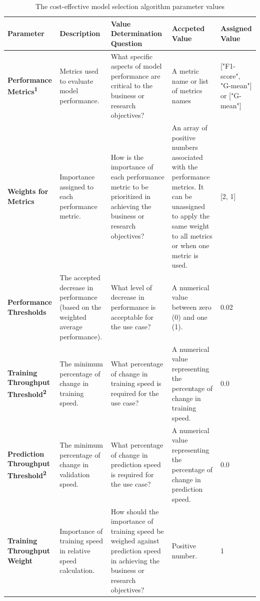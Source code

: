\begin{table}[!ht]
    \centering
    \scriptsize
    \caption{The cost-effective model selection algorithm parameter values}

        \begin{tabularx}{\textwidth}{|C|C|C|C|C|}
        \hline
            \textbf{Parameter} & \textbf{Description} & \textbf{Value Determination Question} & \textbf{Accpeted Value} & \textbf{Assigned Value } \\ \hline
            \textbf{Performance Metrics\textsuperscript{1}} & Metrics used to evaluate model performance. & What specific aspects of model performance are critical to the business or research objectives? & A metric name or list of metrics names & ["F1-score", "G-mean"] or ["G-mean"]  \\ \hline
            \textbf{Weights for Metrics} & Importance assigned to each performance metric. & How is the importance of each performance metric to be prioritized in achieving the business or research objectives? & An array of positive numbers associated with the performance metrics. It can be unassigned to apply the same weight to all metrics or when one metric is used. & [2, 1]  \\ \hline
            \textbf{Performance Thresholds} & The accepted decrease in performance (based on the weighted average performance). & What level of decrease in performance is acceptable for the use case? & A numerical value between zero (0) and one (1). & 0.02  \\ \hline
            \textbf{Training Throughput Threshold\textsuperscript{2}} & The minimum percentage of change in training speed. & What percentage of change in training speed is required for the use case? & A numerical value representing the percentage of change in training speed. & 0.0  \\ \hline
            \textbf{Prediction Throughput Threshold\textsuperscript{2}} & The minimum percentage of change in validation speed. & What percentage of change in prediction speed is required for the use case? & A numerical value representing the percentage of change in prediction speed. & 0.0  \\ \hline
            \textbf{Training Throughput Weight} & Importance of training speed in relative speed calculation. & How should the importance of training speed be weighed against prediction speed in achieving the business or research objectives? & Positive number. & 1  \\ \hline

\end{tabularx}
\end{table}
